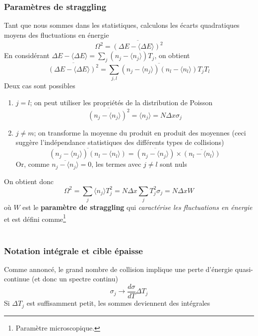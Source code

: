 \subsubsection{Paramètres de straggling}
Tant que nous sommes dans les statistiques, calculons les écarts quadratiques moyens des
fluctuations en énergie
\begin{equation}
\Omega^2=\overline{(\Delta E-\langle \Delta E \rangle)^2}
\end{equation}
En considérant $\Delta E-\langle \Delta E \rangle= \sum_j (n_j-\langle n_j \rangle) T_j$, 
on obtient
\begin{equation}
\overline{(\Delta E-\langle \Delta E \rangle)^2}= \sum_{j ,l}\overline{(n_j-\langle n_j \rangle) (n_l-\langle n_l \rangle)}T_jT_l
\end{equation}
Deux cas sont possibles
\begin{enumerate}
\item $j=l$; on peut utiliser les propriétés de la distribution de Poisson
\begin{equation}
\overline{(n_j-\langle n_j \rangle)^2}=\langle n_j \rangle=N\Delta x \sigma_j
\end{equation}
\item $j\neq m$; on transforme la moyenne du produit en produit des moyennes 
(ceci suggère l'indépendance statistiques des différents types de collisions)
\begin{equation}
\overline{(n_j-\langle n_j \rangle) (n_l-\langle n_l \rangle)}=\overline{(n_j-\langle n_j \rangle)}\times\overline{(n_l-\langle n_l \rangle)}
\end{equation}
Or, comme $\overline{n_j-\langle n_j \rangle}=0$, les termes avec $j\neq l$ sont nuls
\end{enumerate}
On obtient donc
\begin{equation}
\Omega^2=\sum_j\langle n_j \rangle T_j^2=N\Delta x\sum_jT_j^2\sigma_j=N\Delta xW
\end{equation}
où $W$ est le \textbf{paramètre de straggling} qui \textit{caractérise les fluctuations en 
énergie} et est défini comme\footnote{Paramètre microscopique.}\ \\

\ \\

\subsubsection{Notation intégrale et cible épaisse}
Comme annoncé, le grand nombre de collision implique une perte d'énergie quasi-continue (et 
donc un spectre continu)
\begin{equation}
\sigma_j \rightarrow \frac{d\sigma}{dT}\Delta T_j
\end{equation}
Si $\Delta T_j$ est suffisamment petit, les sommes deviennent des intégrales\ \\

